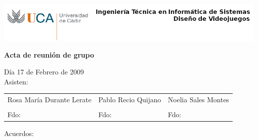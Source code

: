 \documentclass[a4paper,10pt]{article}
\begin{document}
\includegraphics[scale=0.6]{../uca.png}

\begin{center}
  \noindent \huge\textbf{ Acta de reunión de grupo}\\
\end{center}

\noindent Día 17 de Febrero de 2009\\

\noindent Asisten:

\begin{center}
\begin{tabular}{|m{5.2cm}|m{5.2cm}|m{5.2cm}|}
  \hline
  Rosa María Durante Lerate & Pablo Recio Quijano & Noelia Sales Montes\\
  &  & \\[2cm]
  Fdo: & Fdo: & Fdo: \\
  \hline
\end{tabular}
\end{center}

\noindent Acuerdos:\\
\end{document}
